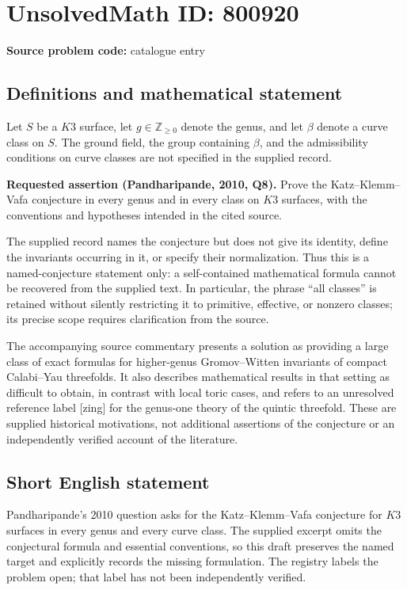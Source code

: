 \documentclass[11pt]{article}
\newcommand{\Z}{\mathbb{Z}}
\begin{document}
\section*{UnsolvedMath ID: 800920}
\textbf{Source problem code:} catalogue entry
\subsection{Definitions and mathematical statement}
Let \(S\) be a \(K3\) surface, let \(g\in\Z_{\geq 0}\) denote the genus, and let \(\beta\) denote a curve class on \(S\). The ground field, the group containing \(\beta\), and the admissibility conditions on curve classes are not specified in the supplied record.

\textbf{Requested assertion (Pandharipande, 2010, Q8).} Prove the Katz--Klemm--Vafa conjecture in every genus and in every class on \(K3\) surfaces, with the conventions and hypotheses intended in the cited source.

The supplied record names the conjecture but does not give its identity, define the invariants occurring in it, or specify their normalization. Thus this is a named-conjecture statement only: a self-contained mathematical formula cannot be recovered from the supplied text. In particular, the phrase ``all classes'' is retained without silently restricting it to primitive, effective, or nonzero classes; its precise scope requires clarification from the source.

The accompanying source commentary presents a solution as providing a large class of exact formulas for higher-genus Gromov--Witten invariants of compact Calabi--Yau threefolds. It also describes mathematical results in that setting as difficult to obtain, in contrast with local toric cases, and refers to an unresolved reference label \textup{[zing]} for the genus-one theory of the quintic threefold. These are supplied historical motivations, not additional assertions of the conjecture or an independently verified account of the literature.
\subsection{Short English statement}
Pandharipande's 2010 question asks for the Katz--Klemm--Vafa conjecture for \(K3\) surfaces in every genus and every curve class. The supplied excerpt omits the conjectural formula and essential conventions, so this draft preserves the named target and explicitly records the missing formulation. The registry labels the problem open; that label has not been independently verified.
\end{document}
